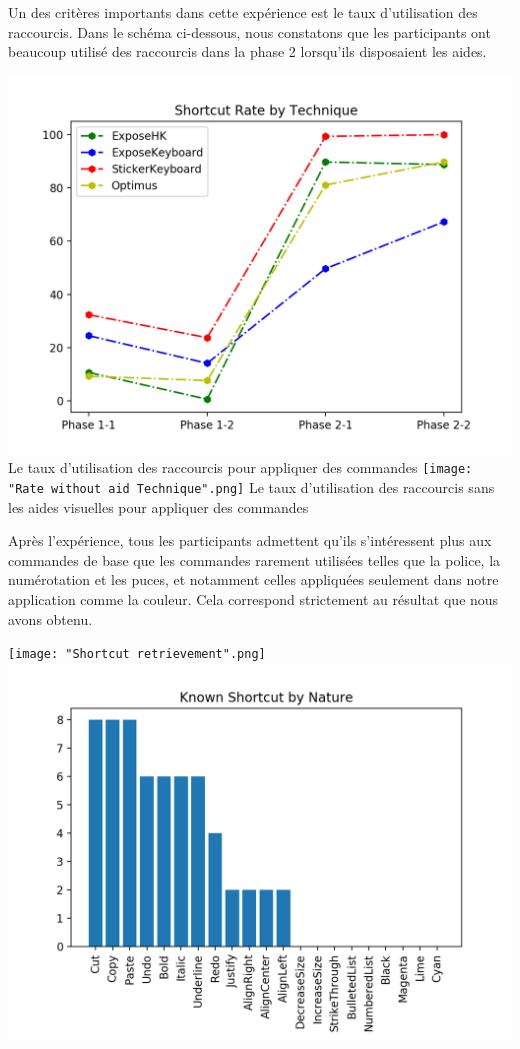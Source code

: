\documentclass[12pt,a4paper]{article}
\begin{document}
Un des critères importants dans cette expérience est le taux d'utilisation des raccourcis. Dans le schéma ci-dessous, nous constatons que les participants ont beaucoup utilisé des raccourcis dans la phase 2 lorsqu'ils disposaient les aides.
\begin{center}
	\includegraphics[width=1\linewidth]{RateTechnique.png}
	Le taux d'utilisation des raccourcis pour appliquer des commandes
	\texttt{[image: "Rate without aid Technique".png]}
	Le taux d'utilisation des raccourcis sans les aides visuelles pour appliquer des commandes
\end{center}

Après l'expérience, tous les participants admettent qu'ils s'intéressent plus aux commandes de base que les commandes rarement utilisées telles que la police, la numérotation et les puces, et notamment celles appliquées seulement dans notre application comme la couleur. Cela correspond strictement au résultat que nous avons obtenu.
\begin{center}
	\texttt{[image: "Shortcut retrievement".png]}
	\includegraphics[width=1\linewidth]{Nature.png}
\end{center}
\end{document}
